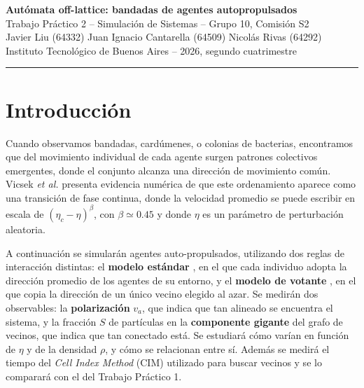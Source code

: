\documentclass[10pt,a4paper]{article}
\newcommand{\va}{\ensuremath{v_a}}
\begin{document}
\begin{center}
    {\large\textbf{Autómata off-lattice: bandadas de agentes autopropulsados}}\\[0.2em]
    {\normalsize Trabajo Práctico 2 -- Simulación de Sistemas -- Grupo 10, Comisión S2}\\[0.4em]
    {\small Javier Liu (64332) \quad Juan Ignacio Cantarella (64509) \quad Nicolás Rivas (64292)}\\[0.1em]
    {\small Instituto Tecnológico de Buenos Aires -- 2026, segundo cuatrimestre}
\end{center}
\vspace{0.4em}
\hrule
\vspace{0.8em}

\section{Introducción}

Cuando observamos bandadas, cardúmenes, o colonias de bacterias, encontramos que del movimiento individual de cada agente surgen patrones colectivos emergentes, donde el conjunto alcanza una dirección de movimiento común.
Vicsek \textit{et al.} \cite{vicsek1995} presenta evidencia numérica de que este ordenamiento aparece como una transición de fase continua, donde la velocidad promedio se puede escribir en escala de $(\eta_c - \eta)^\beta$, con $\beta \simeq 0.45$ y donde $\eta$ es un parámetro de perturbación aleatoria.

A continuación se simularán agentes auto-propulsados, utilizando dos reglas de interacción distintas: el \textbf{modelo estándar} \cite{vicsek1995}, en el que cada individuo adopta la dirección promedio de los agentes de su entorno, y el \textbf{modelo de votante} \cite{loscar2021}, en el que copia la dirección de un único vecino elegido al azar.
Se medirán dos observables: la \textbf{polarización} \va, que indica que tan alineado se encuentra el sistema, y la fracción $S$ de partículas en la \textbf{componente gigante} del grafo de vecinos, que indica que tan conectado está.
Se estudiará cómo varían en función de $\eta$ y de la densidad $\rho$, y cómo se relacionan entre sí. Además se medirá el tiempo del \textit{Cell Index Method} (CIM) utilizado para buscar vecinos y se lo comparará con el del Trabajo Práctico 1.
\end{document}
